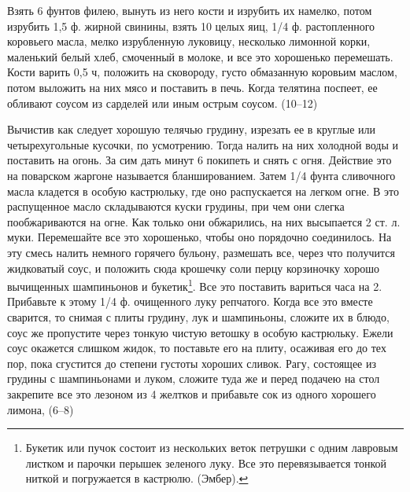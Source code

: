 
Взять 6 фунтов филею, вынуть из него кости и изрубить их намелко, потом изрубить 1,5 ф. жирной свинины, взять 10 целых яиц, 1/4 ф. растопленного коровьего масла, мелко изрубленную луковицу, несколько лимонной корки, маленький белый хлеб, смоченный в молоке, и все это хорошенько перемешать. Кости варить 0,5 ч, положить на сковороду, густо обмазанную коровьим маслом, потом выложить на них мясо и поставить в печь. Когда телятина поспеет, ее обливают соусом из сарделей или иным острым соусом. (10--12) 


Вычистив как следует хорошую телячью грудину, изрезать ее в круглые или четырехугольные кусочки, по усмотрению. Тогда налить на них холодной воды и поставить на огонь. За сим дать минут 6 покипеть и снять с огня. Действие это на поварском жаргоне называется бланшированием. Затем 1/4 фунта сливочного масла кладется в особую кастрюльку, где оно распускается на легком огне. В это распущенное масло складываются куски грудины, при чем они слегка пообжариваются на огне. Как только они обжарились, на них высыпается 2 ст. л. муки. Перемешайте все это хорошенько, чтобы оно порядочно соединилось. На эту смесь налить немного горячего бульону, размешать все, через что получится жидковатый соус, и положить сюда крошечку соли перцу корзиночку хорошо вычищенных шампиньонов и букетик\footnote{Букетик или пучок состоит из нескольких веток петрушки с одним лавровым листком и парочки перышек зеленого луку. Все это перевязывается тонкой ниткой и погружается в кастрюлю. (Эмбер).}. Все это поставить вариться часа на 2. Прибавьте к этому 1/4 ф. очищенного луку репчатого. Когда все это вместе сварится, то снимая с плиты грудину, лук и шампиньоны, сложите их в блюдо, соус же пропустите через тонкую чистую ветошку в особую кастрюльку. Ежели соус окажется слишком жидок, то поставьте его на плиту, осаживая его до тех пор, пока сгустится до степени густоты хороших сливок. Рагу, состоящее из грудины с шампиньонами и луком, сложите туда же и перед подачею на стол закрепите все это лезоном из 4 желтков и прибавьте сок из одного хорошего лимона, (6--8) 


